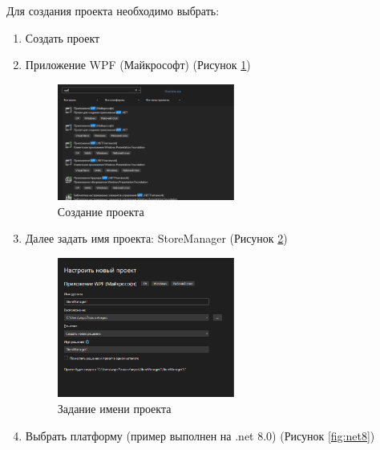 \documentclass[12pt]{article}
\renewcommand{\texttt}[1]{{\small\ttfamily #1}}
\begin{document}
Для создания проекта необходимо выбрать:
\begin{enumerate}
	\item Создать проект
	\item Приложение \texttt{WPF} (Майкрософт) (Рисунок \ref{fig:projectcreate})

	      \begin{figure}[H]
		      \centering
		      \includegraphics[width=0.55\textwidth]{fig/image 2.png}
		      \caption{Создание проекта}
		      \label{fig:projectcreate}
	      \end{figure}

	\item Далее задать имя проекта: \texttt{StoreManager} (Рисунок \ref{fig:createnameproject})

	      \begin{figure}[H]
		      \centering
		      \includegraphics[width=0.55\textwidth]{fig/image 3.png}
		      \caption{Задание имени проекта}
		      \label{fig:createnameproject}
	      \end{figure}

	      \newpage

	\item Выбрать платформу (пример выполнен на .net 8.0) (Рисунок \ref{fig:net8})


\end{enumerate}
\end{document}
